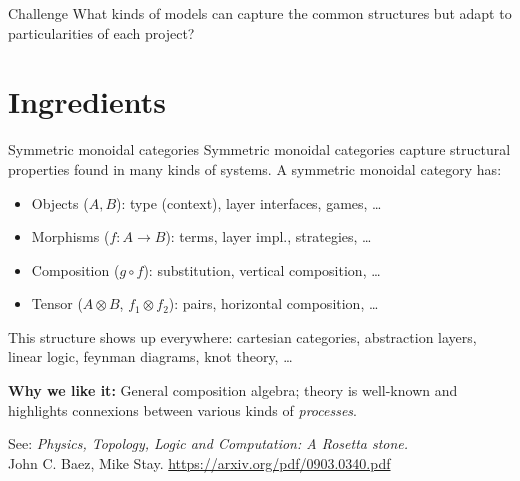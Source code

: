 \documentclass{beamer}
\begin{document}
\begin{frame}{Challenge}
  What kinds of models can capture the common structures
  but adapt to particularities of each project?
\end{frame}


\section{Ingredients}

\begin{frame}{Symmetric monoidal categories}
  Symmetric monoidal categories capture structural properties
  found in many kinds of systems.
  A symmetric monoidal category has:
  \begin{itemize}
  \item Objects ($A, B$):
    type (context), layer interfaces, games, \ldots
  \item Morphisms ($f : A \rightarrow B$):
    terms, layer impl., strategies, \ldots
  \item Composition ($g \circ f$):
    substitution, vertical composition, \ldots
  \item Tensor ($A \otimes B$, $f_1 \otimes f_2$):
    pairs, horizontal composition, \ldots
  \end{itemize}

  \vfill
  This structure shows up everywhere:
  cartesian categories, abstraction layers, linear logic,
  feynman diagrams, knot theory, \ldots

  \vfill
  \textbf{Why we like it:}
  General composition algebra;
  theory is well-known and highlights connexions
  between various kinds of \emph{processes}.

  \vfill \small
  See:
  \emph{Physics, Topology, Logic and Computation: A Rosetta stone.} \\
  John C. Baez, Mike Stay.
  \url{https://arxiv.org/pdf/0903.0340.pdf}
\end{frame}
\end{document}
